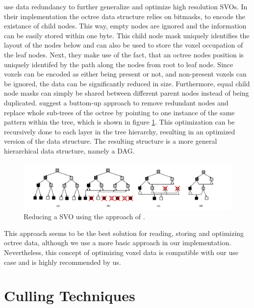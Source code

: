 \cite{Assarsson2013} use data redundancy to further generalize and optimize high resolution \ac{SVO}s. In their 
implementation the octree data structure relies on bitmasks, to encode the existance of child nodes. This way, 
empty nodes are ignored and the information can be easily stored within one byte. This child node mask uniquely 
identifies the layout of the nodes below and can also be used to store the voxel occupation of the leaf nodes.
Next, they make use of the fact, that an octree nodes position is uniquely identifed by the path along the 
nodes from root to leaf node. Since voxels can be encoded as either being present or not, and non-present 
voxels can be ignored, the data can be significantly reduced in size. Furthermore, equal child node masks 
can simply be shared between different parent nodes instead of being duplicated. \cite{Assarsson2013} suggest 
a buttom-up approach to remove redundant nodes and replace whole sub-trees of the octree by pointing to one 
instance of the same pattern within the tree, which is shown in figure \ref{fig:sparse-voxel-dag-creation}. 
This optimization can be recursively done to each layer in the tree hierarchy, resulting in an optimized version 
of the data structure. The resulting structure is a more general hierarchical data structure, namely a \ac{DAG}.

\begin{figure}[h]
    \centering
    \includegraphics[width=\linewidth]{images/graphics/highres-sv-dag.png}
    \caption{Reducing a \ac{SVO} using the approach of \cite{Assarsson2013}.}
    \label{fig:sparse-voxel-dag-creation}
\end{figure}

This approach seems to be the best solution for reading, storing and optimizing octree data, although we use 
a more basic approach in our implementation. Nevertheless, this concept of optimizing voxel data is compatible 
with our use case and is highly recommended by us.

\section{Culling Techniques} \label{sec-culling-techniques}

